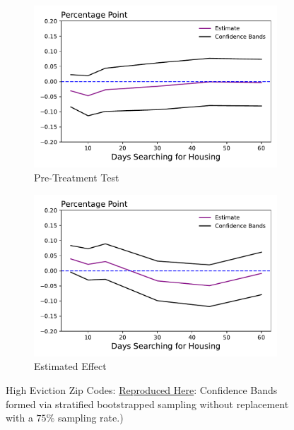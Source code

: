 \documentclass[a4paper,12pt]{article}
\begin{document}
\begin{figure}[htbp]
\centering
\begin{subfigure}{.48\textwidth}
    \centering
    \includegraphics[width=.95\linewidth]{figures/rtc/results/cceh/diff_in_mean_True_False_True.pdf}
    \caption{Pre-Treatment Test}
    \label{SUBFIGURE LABEL 3}
\end{subfigure}
\begin{subfigure}{.48\textwidth}
    \centering
    \includegraphics[width=.95\linewidth]{figures/rtc/results/cceh/diff_in_mean_True_False_False.pdf}
    \caption{Estimated Effect}
    \label{fig:diff_mean_high}
\end{subfigure}
\caption{High Eviction Zip Codes: \href{https://github.com/pharringtonp19/evictions/blob/main/scripts/cceh/primary/diff_n_mean_rrh.py}{Reproduced Here}: Confidence Bands formed via stratified bootstrapped sampling without replacement with a $75\%$ sampling rate.)}
\label{fig:diff_mean}
\end{figure}
\end{document}
